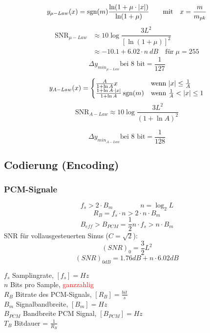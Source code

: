 \begin{minipage}{9cm}
\[ y_{\mu-Law}(x) = \operatorname{sgn}(m) \frac{\ln(1+\mu\cdot|x|)}{\ln(1+\mu)} \qquad \text{mit} \quad
x = \frac{m}{m_{pk}}\]
\vspace*{-0.5cm}
\begin{align*}\text{SNR}_{\mu-Law} &\approx 10 \log \dfrac{3 L^2}{[\ln(1 + \mu)]^2} \\
	&\approx -10.1 + 6.02 \cdot n \: dB \quad \text{f\"ur} \; \mu = 255 
\end{align*}
	\[ \Delta y_{min_{\mu-Law}} \text{bei 8 bit} = \frac{1}{127}
	\]
	
\end{minipage}
\begin{minipage}{9cm}
\[y_{A-Law}(x)=\begin{cases} \frac{A}{1+ \ln A} x & \mbox{wenn } |x| \le \frac{1}{A} \\
	\frac{1 + \ln A\cdot |x|}{1+ \ln A}\operatorname{sgn}(m) & \mbox{wenn } \frac{1}{A} < |x| \le 1 \end{cases} \]
\[\text{SNR}_{A-Law} \approx 10 \log \dfrac{3 L^2}{(1+\ln A)^2}\]

	\[ \Delta y_{min_{A-Law}} \text{bei 8 bit} = \frac{1}{128}
		\]
\end{minipage}

\subsection{Codierung (Encoding) }

\subsubsection{PCM-Signale}
\begin{minipage}{9cm}
	\[f_s > 2 \cdot B_m  \qquad \qquad n = \log_2L\]  
	\[R_B = f_s \cdot n > 2 \cdot n \cdot B_m\] 
	\[B_{eff} > B_{PCM} = \frac{1}{2} n \cdot f_s > n \cdot B_m\]
	SNR für vollausgesteuerten Sinus ($C = \sqrt{2}$):	
	\[(SNR)_0 = \frac{3}{2}L^2\]
	\[(SNR)_{0dB}
		= 1.76dB + n \cdot  6.02dB\]
\end{minipage}
\begin{minipage}{9cm}
	$f_s$ Samplingrate, $[f_s] = Hz$ \\
	$n$ Bits pro Sample, \textcolor{red}{ganzzahlig} \\
	$R_B$ Bitrate des PCM-Signals, $[R_B] = \frac{bit}{s}$ \\
	$B_m$ Signalbandbreite, $[B_m] = Hz $ \\
	$B_{PCM}$ Bandbreite PCM Signal, $[B_{PCM}] = Hz $\\
	$T_B$ Bitdauer = $\frac{1}{R_B}$
\end{minipage}


